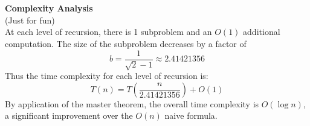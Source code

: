\documentclass[12pt]{article}
\begin{document}
\\\\
{\bf Complexity Analysis}\\
(Just for fun)\\
At each level of recursion, there is 1 subproblem and an $O(1)$ additional computation. The size of the subproblem decreases by a factor of 
\[b = \frac{1}{\sqrt{2} - 1} \approx 2.41421356 \]
Thus the time complexity for each level of recursion is:
\[T(n) = T\left(\frac{n}{2.41421356}\right) + O(1)\]
By application of the master theorem, the overall time complexity is $O(\log n)$, a significant improvement over the $O(n)$ naive formula.
\end{document}
